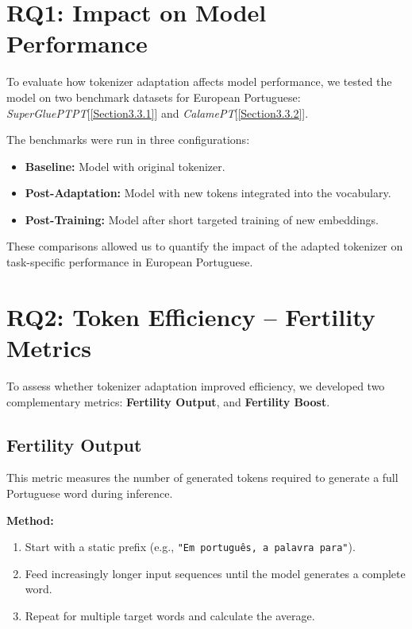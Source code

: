 \section{RQ1: Impact on Model Performance}
\label{sec:model_performance}

To evaluate how tokenizer adaptation affects model performance, we tested the model on two benchmark datasets for European Portuguese: \textit{SuperGluePTPT}[\ref{Section3.3.1}] and \textit{CalamePT}[\ref{Section3.3.2}].

The benchmarks were run in three configurations:
\begin{itemize}
    \item \textbf{Baseline:} Model with original tokenizer.
    \item \textbf{Post-Adaptation:} Model with new tokens integrated into the vocabulary.
    \item \textbf{Post-Training:} Model after short targeted training of new embeddings.
\end{itemize}

These comparisons allowed us to quantify the impact of the adapted tokenizer on task-specific performance in European Portuguese.

\section{RQ2: Token Efficiency – Fertility Metrics}
\label{sec:fertility_metric}

To assess whether tokenizer adaptation improved efficiency, we developed two complementary metrics:  \textbf{Fertility Output}, and \textbf{Fertility Boost}.


\subsection*{\textbf{Fertility Output}}
\label{subsec:fertility_output}

This metric measures the number of generated tokens required to generate a full Portuguese word during inference.

\textbf{Method:}
\begin{enumerate}
    \item Start with a static prefix (e.g., \texttt{"Em português, a palavra para"}).
    \item Feed increasingly longer input sequences until the model generates a complete word.
    \item Repeat for multiple target words and calculate the average.
\end{enumerate}

